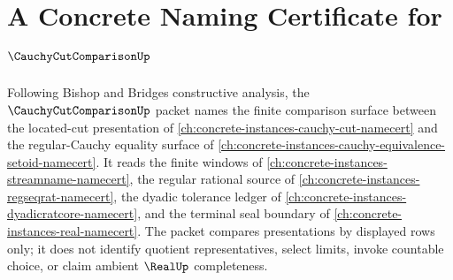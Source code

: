 \chapter{A Concrete Naming Certificate for $\CauchyCutComparisonUp$}
\label{ch:concrete-instances-cauchy-cut-comparison-namecert}

Following Bishop and Bridges constructive analysis, the $\CauchyCutComparisonUp$ packet names the finite comparison surface between the located-cut presentation of \autoref{ch:concrete-instances-cauchy-cut-namecert} and the regular-Cauchy equality surface of \autoref{ch:concrete-instances-cauchy-equivalence-setoid-namecert}. It reads the finite windows of \autoref{ch:concrete-instances-streamname-namecert}, the regular rational source of \autoref{ch:concrete-instances-regseqrat-namecert}, the dyadic tolerance ledger of \autoref{ch:concrete-instances-dyadicratcore-namecert}, and the terminal seal boundary of \autoref{ch:concrete-instances-real-namecert}. The packet compares presentations by displayed rows only; it does not identify quotient representatives, select limits, invoke countable choice, or claim ambient $\RealUp$ completeness.


